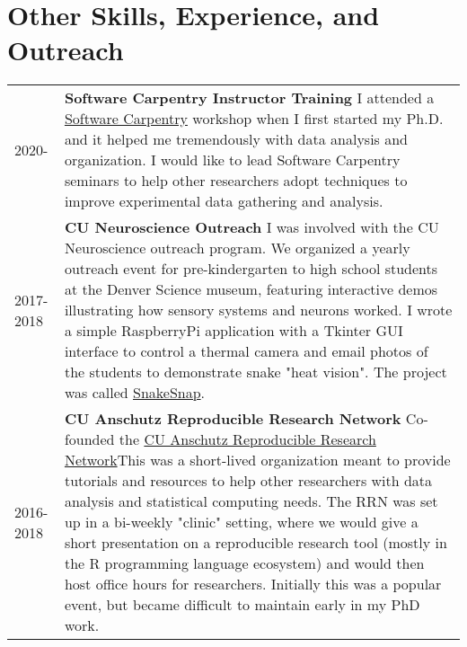 \documentclass[11pt]{article}
\begin{document}
\section*{Other Skills, Experience, and Outreach}
\label{sec:org38d7ef4}
\begin{tabular}{lp{}}
2020-& \textbf{Software Carpentry Instructor Training} \newline I attended a \href{https://software-carpentry.org/}{Software Carpentry} workshop when I first started my Ph.D. and it helped me tremendously with data analysis and organization. I would like to lead Software Carpentry seminars to help other researchers adopt techniques to improve experimental data gathering and analysis.\\
2017-2018& \textbf{CU Neuroscience Outreach}\newline
I was involved with the CU Neuroscience outreach program. We organized a yearly outreach event for pre-kindergarten to high school students at the Denver Science museum, featuring interactive demos illustrating how sensory systems and neurons worked. I wrote a simple RaspberryPi application with a Tkinter GUI interface to control a thermal camera and email photos of the students to demonstrate snake "heat vision". The project was called \href{https://github.com/nkicg6/thermalsnap}{SnakeSnap}.\\
2016-2018& \textbf{CU Anschutz Reproducible Research Network} \newline Co-founded the \href{https://ucd-reproducible-research-clinic.github.io/members.html}{CU Anschutz Reproducible Research Network}\newline This was a short-lived organization meant to provide tutorials and resources to help other researchers with data analysis and statistical computing needs. The RRN was set up in a bi-weekly "clinic" setting, where we would give a short presentation on a reproducible research tool (mostly in the R programming language ecosystem) and would then host office hours for researchers. Initially this was a popular event, but became difficult to maintain early in my PhD work.\\

\end{tabular}
\end{document}
